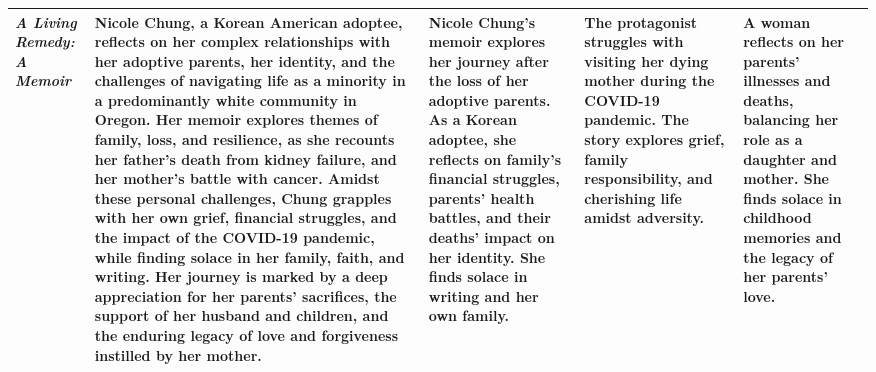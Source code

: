 \begin{longtable}{|p{1cm}|p{3cm}|p{3cm}|p{3cm}|p{3cm}|}
    \textit{A Living Remedy: A Memoir} & {\color{character}Nicole Chung}, a {\color{theme}Korean American adoptee}, reflects on her complex relationships with her adoptive parents, her identity, and the challenges of navigating life as a minority in a predominantly white community in {\color{location}Oregon}. Her memoir explores themes of {\color{theme}family, loss, and resilience}, as she recounts her {\color{event}father's death from kidney failure}, and her {\color{event}mother's battle with cancer}. Amidst these personal challenges, Chung grapples with her own grief, financial struggles, and the impact of the {\color{event}COVID-19 pandemic}, while finding solace in her family, faith, and writing. Her journey is marked by a deep appreciation for her parents' sacrifices, the support of her husband and children, and the enduring legacy of love and forgiveness instilled by her mother. & {\color{character}Nicole Chung's} memoir explores her journey after the {\color{event}loss of her adoptive parents}. As a Korean adoptee, she reflects on family's financial struggles, parents' health battles, and their deaths' impact on her identity. She finds solace in writing and her own family. & The protagonist struggles with {\color{event}visiting her dying mother during the COVID-19 pandemic}. The story explores {\color{theme}grief, family responsibility, and cherishing life} amidst adversity. & A woman reflects on her {\color{event}parents' illnesses and deaths}, balancing her role as a daughter and mother. She finds solace in {\color{theme}childhood memories} and the legacy of her parents' love. \\
    \hline

\end{longtable}
